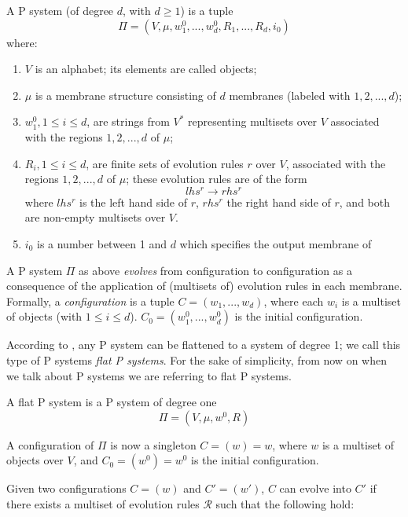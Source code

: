 \begin{definition}[P system]
A P system (of degree $d$, with $d \geq 1$) is a tuple
\[ \Pi = (V,\mu,w^0_1,...,w^0_d,R_1,...,R_d, i_0)\]
where:
\begin{enumerate}
  \item $V$ is an alphabet; its elements are called objects;
  \item $\mu$ is a membrane structure consisting of $d$ membranes (labeled with $1,2,...,d$);
  \item $w^0_1, 1 \leq i \leq d$, are strings from $V^*$ representing multisets over $V$ associated
  with the regions $1,2,...,d$ of $\mu$;
  \item $R_i, 1 \leq i \leq d$, are finite sets of evolution rules $r$ over $V$, associated 
  with the regions $1,2,...,d$ of $\mu$; these evolution rules are of the form 
  \[ lhs^r \rightarrow rhs^r \]
  where $lhs^r$ is the left hand side of $r$, $rhs^r$ the right hand side of $r$, and both are non-empty multisets over $V$.
  \item $i_0$ is a number between 1 and $d$ which specifies the output membrane of %
\end{enumerate}
A P system $\Pi$ as above \textit{evolves} from configuration to configuration as a consequence of the application of (multisets of) evolution rules in each membrane.
Formally, a \textit{configuration} is a tuple $C=(w_1,...,w_d)$, where each $w_i$ is a multiset of objects (with $1 \leq i \leq d$).
$C_0=(w^0_1,...,w^0_d)$ is the initial configuration.
\end{definition}

According to \cite{agrigoroaiei2010flattening}, any P system can be flattened to a system of degree 1; we call this type of P systems \textit{flat P systems}.
For the sake of simplicity, from now on when we talk about P systems we are referring to flat P systems.

\begin{definition}
A flat P system is a P system of degree one
\[ \Pi = (V,\mu,w^0,R) \]

A configuration of $\Pi$ is now a singleton $C=(w)=w$, where $w$ is a multiset of objects over $V$, and 
$C_0=(w^0)=w^0$ is the initial configuration.
\end{definition}

Given two configurations $C=(w)$ and $C'=(w')$, $C$ can evolve into $C'$ if there exists a multiset of evolution rules $\mathcal{R}$ such that the following hold:

